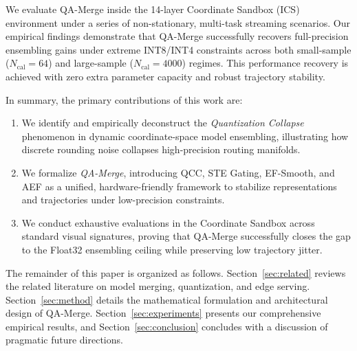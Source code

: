We evaluate QA-Merge inside the 14-layer Coordinate Sandbox (ICS) environment under a series of non-stationary, multi-task streaming scenarios. Our empirical findings demonstrate that QA-Merge successfully recovers full-precision ensembling gains under extreme INT8/INT4 constraints across both small-sample ($N_{\text{cal}}=64$) and large-sample ($N_{\text{cal}}=4000$) regimes. This performance recovery is achieved with zero extra parameter capacity and robust trajectory stability. 

In summary, the primary contributions of this work are:
\begin{enumerate}
    \item We identify and empirically deconstruct the \emph{Quantization Collapse} phenomenon in dynamic coordinate-space model ensembling, illustrating how discrete rounding noise collapses high-precision routing manifolds.
    \item We formalize \emph{QA-Merge}, introducing QCC, STE Gating, EF-Smooth, and AEF as a unified, hardware-friendly framework to stabilize representations and trajectories under low-precision constraints.
    \item We conduct exhaustive evaluations in the Coordinate Sandbox across standard visual signatures, proving that QA-Merge successfully closes the gap to the Float32 ensembling ceiling while preserving low trajectory jitter.
\end{enumerate}

The remainder of this paper is organized as follows. Section~\ref{sec:related} reviews the related literature on model merging, quantization, and edge serving. Section~\ref{sec:method} details the mathematical formulation and architectural design of QA-Merge. Section~\ref{sec:experiments} presents our comprehensive empirical results, and Section~\ref{sec:conclusion} concludes with a discussion of pragmatic future directions.
